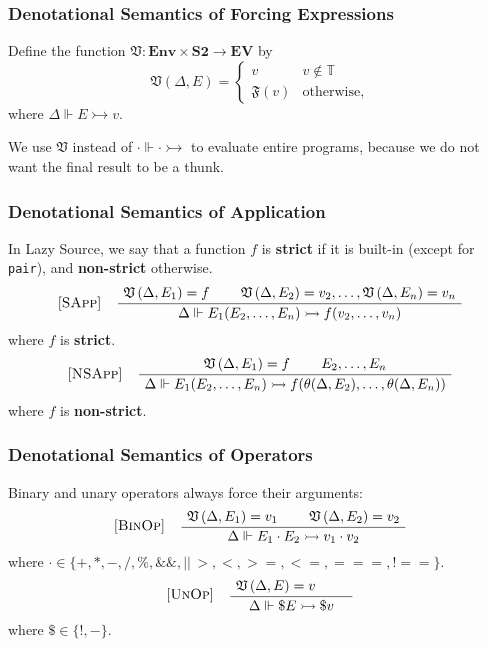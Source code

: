 \documentclass[12pt]{beamer}
\makeatletter
\newenvironment{boxedprooftree}[1][c]
 {\begin{tabular}[#1]{@{}c@{}}}
 {\DisplayProof\end{tabular}}
\makeatother
\begin{document}
\begin{frame}
\frametitle{Denotational Semantics of Forcing Expressions}
Define the function $\mathfrak{V}:\textbf{Env}\times\textbf{S2}\to\mathbf{EV}$ by
\[ \mathfrak{V}\left(\Delta,E\right) = \begin{cases} 
      v & v\notin\mathbb{T} \\
      \mathfrak{F}(v) & \text{otherwise},
   \end{cases}
\]
where $\Delta\Vdash E \rightarrowtail v$.\pause

\vspace{1em}We use $\mathfrak{V}$ instead of $\cdot\Vdash\cdot\rightarrowtail$ to evaluate entire programs, because we do not want the final result to be a thunk.
\end{frame}

\begin{frame}
\frametitle{Denotational Semantics of Application}
In Lazy Source, we say that a function $f$ is \textbf{strict} if it is built-in (except for \texttt{pair}), and \textbf{non-strict} otherwise.\pause
\[
\begin{tabular}{@{} l c @{}}
[\textsc{SApp}] &
  \begin{boxedprooftree}
  \AxiomC{$\tforce{\Delta}{E_1}=f$}
  \AxiomC{$\tforce{\Delta}{E_2}=v_2,\ldots,\tforce{\Delta}{E_n}=v_n$}
  \BinaryInfC{$\Delta\Vdash E_1(E_2,\ldots,E_n)\rightarrowtail f(v_2,\ldots,v_n)$}
  \end{boxedprooftree}
\end{tabular}
\]
where $f$ is \textbf{strict}.\pause
\[
\begin{tabular}{@{} l c @{}}
[\textsc{NSApp}] &
  \begin{boxedprooftree}
  \AxiomC{$\tforce{\Delta}{E_1}=f$}
  \AxiomC{$E_2,\ldots,E_n$}
  \BinaryInfC{$\Delta\Vdash E_1(E_2,\ldots,E_n)\rightarrowtail f(\theta(\Delta, E_2),\ldots,\theta(\Delta, E_n))$}
  \end{boxedprooftree}
\end{tabular}
\]
where $f$ is \textbf{non-strict}.
\end{frame}

\begin{frame}
\frametitle{Denotational Semantics of Operators}
Binary and unary operators always force their arguments:
\[
\begin{tabular}{@{} l c @{}}
[\textsc{BinOp}] &
  \begin{boxedprooftree}
  \AxiomC{$\tforce{\Delta}{E_1}=v_1$}
  \AxiomC{$\tforce{\Delta}{E_2}=v_2$}
  \BinaryInfC{$\Delta\Vdash E_1\cdot E_2\rightarrowtail v_1 \cdot v_2$}
  \end{boxedprooftree}
\end{tabular}
\]
where $\cdot\in\{+,*,-,/,\%,\&\&,||\,>,<,>=,<=,== =,!==\}$.
\[
\begin{tabular}{@{} l c @{}}
[\textsc{UnOp}] &
  \begin{boxedprooftree}
  \AxiomC{$\tforce{\Delta}{E}=v$}
  \AxiomC{}
  \BinaryInfC{$\Delta\Vdash \$E\rightarrowtail \$v$}
  \end{boxedprooftree}
\end{tabular}
\]
where $\$\in\{!,-\}$.
\end{frame}
\end{document}
